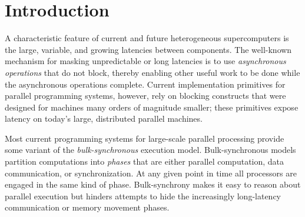 
\section{Introduction}
\label{sec:intro}





A characteristic feature of current and future heterogeneous
supercomputers is the large, variable, and growing latencies between
components.  The well-known mechanism for masking unpredictable or
long latencies is to use {\em asynchronous operations} that do not block,
thereby enabling other useful work to be done while the asynchronous
operations complete. Current implementation primitives for parallel
programming systems, however, rely on blocking constructs that were
designed for machines many orders of magnitude
smaller\cite{MPI,COARRAY_FORTRAN,UPC99}; these primitives expose
latency on today's large, distributed parallel machines.


Most current programming systems for large-scale parallel processing provide some variant
of the {\em bulk-synchronous} execution model\cite{Valiant90}.  Bulk-synchronous models
partition computations into {\em phases} that are either parallel computation, data
communication, or synchronization.  At any given point in time all processors
are engaged in the same kind of phase.  Bulk-synchrony
makes it easy to reason about parallel execution but
hinders attempts to hide the increasingly long-latency communication
or memory movement phases.  

